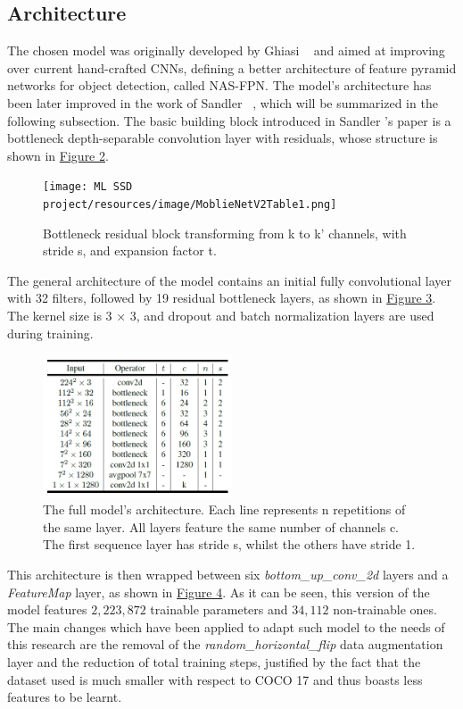 \documentclass[10pt,twocolumn,letterpaper]{article}
\begin{document}
\subsection{Architecture}
\begin{flushleft}
The chosen model was originally developed by Ghiasi \etal~\cite{ghiasi2019nasfpn} and aimed at improving over current hand-crafted CNNs, defining a better architecture of feature pyramid networks for object detection, called NAS-FPN.
The model's architecture has been later improved in the work of Sandler \etal~\cite{sandler2019mobilenetv2}, which will be summarized in the following subsection.
The basic building block introduced in Sandler \etal's paper is a bottleneck depth-separable convolution layer with residuals, whose structure is shown in \hyperref[figure2]{Figure 2}.

\begin{figure}[!h]
    \centering
    \texttt{[image: ML SSD project/resources/image/MoblieNetV2Table1.png]} \caption{Bottleneck residual block transforming from k to k' channels, with stride s, and expansion factor t.}
\end{figure}
\label{figure2}

The general architecture of the model contains an initial fully convolutional layer with 32 filters, followed by 19 residual bottleneck layers, as shown in \hyperref[figure3]{Figure 3}. The kernel size is 3 × 3, and dropout and batch normalization layers are used during training.

\begin{figure}[!h]
    \centering
    \includegraphics[width=0.5\textwidth]{resources/image/MoblieNetV2Table2.png} \caption{The full model's architecture. Each line represents n repetitions of the same layer. All layers feature the same number of channels c. The first sequence layer has stride s, whilst the others have stride 1.}
\end{figure}
\label{figure3}

This architecture is then wrapped between six \textit{bottom\_up\_conv\_2d} layers and a \textit{FeatureMap} layer, as shown in \hyperref[figure4]{Figure 4}.
As it can be seen, this version of the model features $2,223,872$ trainable parameters and $34,112$ non-trainable ones.\linebreak
The main changes which have been applied to adapt such model to the needs of this research are the removal of the \textit{random\_horizontal\_flip} data augmentation layer and the reduction of total training steps, justified by the fact that the dataset used is much smaller with respect to COCO 17 and thus boasts less features to be learnt.\linebreak


\end{flushleft}
\end{document}

